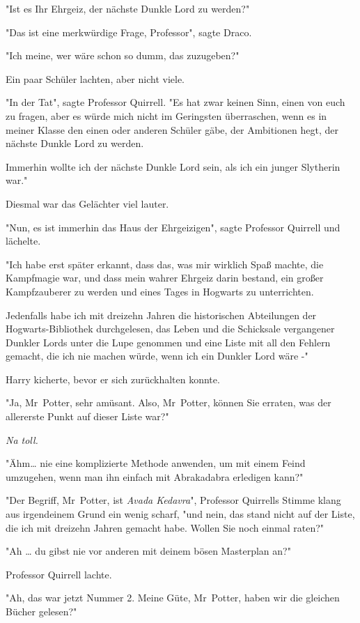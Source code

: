 {"Ist es Ihr Ehrgeiz, der nächste Dunkle Lord zu werden?"

"Das ist eine merkwürdige Frage, Professor", sagte Draco.

"Ich meine, wer wäre schon so dumm, das zuzugeben?"

Ein paar Schüler lachten, aber nicht viele.

"In der Tat", sagte Professor Quirrell. "Es hat zwar keinen Sinn, einen von euch zu fragen, aber es würde mich nicht im Geringsten überraschen, wenn es in meiner Klasse den einen oder anderen Schüler gäbe, der Ambitionen hegt, der nächste Dunkle Lord zu werden.

Immerhin wollte ich der nächste Dunkle Lord sein, als ich ein junger Slytherin war."

Diesmal war das Gelächter viel lauter.

"Nun, es ist immerhin das Haus der Ehrgeizigen", sagte Professor Quirrell und lächelte.

"Ich habe erst später erkannt, dass das, was mir wirklich Spaß machte, die Kampfmagie war, und dass mein wahrer Ehrgeiz darin bestand, ein großer Kampfzauberer zu werden und eines Tages in Hogwarts zu unterrichten.

Jedenfalls habe ich mit dreizehn Jahren die historischen Abteilungen der Hogwarts-Bibliothek durchgelesen, das Leben und die Schicksale vergangener Dunkler Lords unter die Lupe genommen und eine Liste mit all den Fehlern gemacht, die ich nie machen würde, wenn ich ein Dunkler Lord wäre -"

Harry kicherte, bevor er sich zurückhalten konnte.

"Ja, Mr~Potter, sehr amüsant. Also, Mr~Potter, können Sie erraten, was der allererste Punkt auf dieser Liste war?"

\emph{Na toll.}

"Ähm… nie eine komplizierte Methode anwenden, um mit einem Feind umzugehen, wenn man ihn einfach mit Abrakadabra erledigen kann?"

"Der Begriff, Mr~Potter, ist \emph{Avada Kedavra}", Professor Quirrells Stimme klang aus irgendeinem Grund ein wenig scharf, "und nein, das stand nicht auf der Liste, die ich mit dreizehn Jahren gemacht habe. Wollen Sie noch einmal raten?"

"Ah … du gibst nie vor anderen mit deinem bösen Masterplan an?"

Professor Quirrell lachte.

"Ah, das war jetzt Nummer 2. Meine Güte, Mr~Potter, haben wir die gleichen Bücher gelesen?"

}
